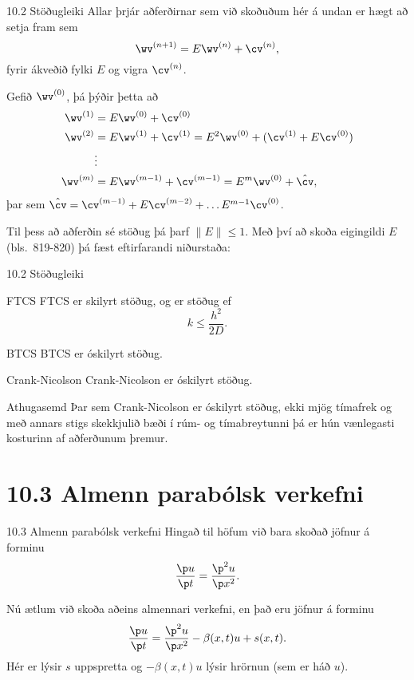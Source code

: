  \begin{frame}{10.2 Stöðugleiki}
 Allar þrjár aðferðirnar sem  við skoðuðum hér á undan er hægt að setja
 fram sem 
 $$
  \wv^{(n+1)} = E\wv^{(n)} + \cv^{(n)},
 $$
 fyrir ákveðið fylki $E$ og vigra $\cv^{(n)}$.
 \pause
 \medskip
 
 Gefið $\wv^{(0)}$, þá þýðir þetta að
 \begin{align*}
  \wv^{(1)} &= E\wv^{(0)} + \cv^{(0)} \\
  \wv^{(2)} &= E\wv^{(1)} + \cv^{(1)} = E^2 \wv^{(0)} + (\cv^{(1)} + E\cv^{(0)}) \\
  &\vdots \\
  \wv^{(m)} &= E\wv^{(m-1)} + \cv^{(m-1)} = E^m \wv^{(0)} + \hat{\cv}, \\
  \end{align*}
  þar sem $\hat\cv = \cv^{(m-1)} + E\cv^{(m-2)} + \ldots E^{m-1} \cv^{(0)}$.
  \pause
  
  
  Til þess að aðferðin sé stöðug þá þarf $\|E\| \leq 1$. Með því að 
  skoða eigingildi $E$ (bls.~819-820) þá fæst eftirfarandi niðurstaða:
  \end{frame}
  
  \begin{frame}{10.2 Stöðugleiki}
  \begin{block}{FTCS}
   FTCS er skilyrt stöðug, og er stöðug ef 
   $$
    k \leq \frac{h^2}{2D}.
    $$
  \end{block}
\pause

  \begin{block}{BTCS}
   BTCS er óskilyrt stöðug.
  \end{block}
\pause
  
  \begin{block}{Crank-Nicolson}
   Crank-Nicolson er óskilyrt stöðug. 
  \end{block}
\pause
  
  \begin{block}{Athugasemd}
   Þar sem Crank-Nicolson er óskilyrt stöðug, ekki mjög tímafrek
   og með annars stigs 
   skekkjulið bæði í rúm- og tímabreytunni þá er hún vænlegasti kosturinn
   af aðferðunum þremur.
  \end{block}
  \end{frame}
  
  \section*{10.3 Almenn parabólsk verkefni}
  \begin{frame}{10.3 Almenn parabólsk verkefni}
   Hingað til höfum við bara skoðað jöfnur á forminu
   $$
    \frac{\p u}{\p t} = \frac{\p^2 u}{\p x^2}.
   $$
   \pause
   
   Nú ætlum við skoða aðeins almennari verkefni, en það eru 
   jöfnur á forminu 
   $$
    \frac{\p u}{\p t} = \frac{\p^2 u}{\p x^2} -\beta(x,t)u + s(x,t).
   $$
   \pause
   Hér er lýsir $s$ uppspretta og $-\beta(x,t)u$ lýsir hrörnun 
   (sem er háð $u$). 
  \end{frame}

